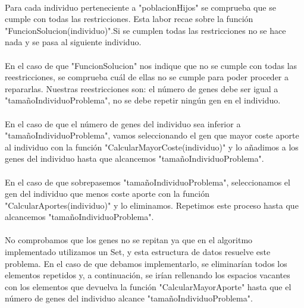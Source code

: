 	\paragraph{}Para cada individuo perteneciente a "poblacionHijos" se comprueba que se cumple con todas las restricciones. Esta labor recae sobre la función "FuncionSolucion(individuo)".Si se cumplen todas las restricciones no se hace nada y se pasa al siguiente individuo.
	
	\paragraph{}En el caso de que "FuncionSolucion" nos indique que no se cumple con todas las reestricciones, se comprueba cuál de ellas no se cumple para poder proceder a repararlas.
	Nuestras reestricciones son: el número de genes debe ser igual a "tamañoIndividuoProblema", no se debe repetir ningún gen en el individuo.
	
	\paragraph{}En el caso de que el número de genes del individuo sea inferior a "tamañoIndividuoProblema", vamos seleccionando el gen que mayor coste aporte al individuo con la función "CalcularMayorCoste(individuo)" y lo añadimos a los genes del individuo hasta que alcancemos "tamañoIndividuoProblema".
	
	\paragraph{}En el caso de que sobrepasemos "tamañoIndividuoProblema", seleccionamos el gen del individuo que menos coste aporte con la función "CalcularAportes(individuo)" y lo eliminamos. Repetimos este proceso hasta que alcancemos "tamañoIndividuoProblema".
	
	\paragraph{}No comprobamos que los genes no se repitan ya que en el algoritmo implementado utilizamos un Set, y esta estructura de datos resuelve este problema. En el caso de que debamos implementarlo, se eliminarían todos los elementos repetidos y, a continuación, se irían rellenando los espacios vacantes con los elementos que devuelva la función "CalcularMayorAporte" hasta que el número de genes del individuo alcance "tamañoIndividuoProblema".
	
